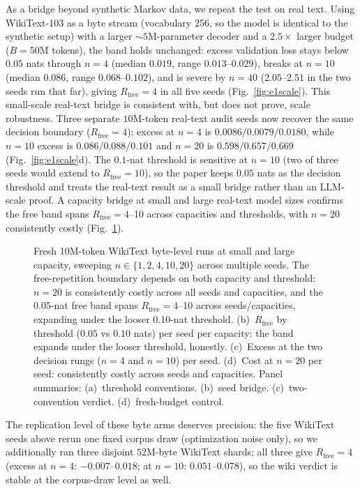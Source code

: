 \documentclass[11pt]{article}
\begin{document}
As a bridge beyond synthetic Markov data, we repeat the test on real text. Using
WikiText-103 as a byte stream
(vocabulary 256, so the model is identical to the synthetic setup) with a larger
${\sim}5$M-parameter decoder and a $2.5\times$ larger budget ($B=50$M tokens), the band
holds unchanged: excess validation loss stays below $0.05$ nats through $n=4$
(median $0.019$, range $0.013$--$0.029$), breaks at $n=10$ (median $0.086$, range
$0.068$--$0.102$), and is severe by $n=40$ ($2.05$--$2.51$ in the two seeds run that
far), giving $R_{\mathrm{free}}=4$ in all five seeds (Fig.~\ref{fig:e1scale}).
This small-scale real-text bridge is consistent with, but does not prove, scale robustness.
Three separate $10$M-token real-text audit seeds now recover the same decision boundary
($R_{\mathrm{free}}=4$): excess at $n=4$ is $0.0086/0.0079/0.0180$, while $n=10$
excess is $0.086/0.088/0.101$ and $n=20$ is $0.598/0.657/0.669$
(Fig.~\ref{fig:e1scale}d). The $0.1$-nat
threshold is sensitive at $n=10$ (two of three seeds would extend to $R_{\mathrm{free}}=10$),
so the paper keeps $0.05$ nats as the decision threshold and treats the real-text result as
a small bridge rather than an LLM-scale proof. A capacity bridge at small and large
real-text model sizes confirms the free band spans $R_{\mathrm{free}}=4$--10 across
capacities and thresholds, with $n=20$ consistently costly
(Fig.~\ref{fig:capacity-bridge}).

\begin{figure}[htbp]
\centering
{}
\caption{Fresh 10M-token WikiText byte-level runs at small and
large capacity, sweeping $n \in \{1, 2, 4, 10, 20\}$ across multiple seeds.
The free-repetition boundary depends on both capacity and threshold:
$n=20$ is consistently costly across all seeds and capacities, and the 0.05-nat free band
spans $R_{\mathrm{free}} = 4$--10 across seeds/capacities, expanding under the looser
0.10-nat threshold.
(b)~$R_{\mathrm{free}}$ by threshold ($0.05$ vs $0.10$ nats) per seed per
capacity: the band expands under the looser threshold, honestly.
(c)~Excess at the two decision rungs ($n=4$ and $n=10$) per seed.
(d)~Cost at $n=20$ per seed: consistently costly across seeds and capacities.
Panel summaries: (a)~threshold conventions. (b)~seed bridge. (c)~two-convention verdict. (d)~fresh-budget control.}
\label{fig:capacity-bridge}
\end{figure}

The replication level of these byte arms deserves precision: the five WikiText seeds
above rerun one fixed corpus draw (optimization noise only), so we additionally ran
three disjoint $52$M-byte WikiText shards; all three give $R_{\mathrm{free}}=4$
(excess at $n=4$: $-0.007$--$0.018$; at $n=10$: $0.051$--$0.078$), so the wiki verdict
is stable at the corpus-draw level as well.
\end{document}
